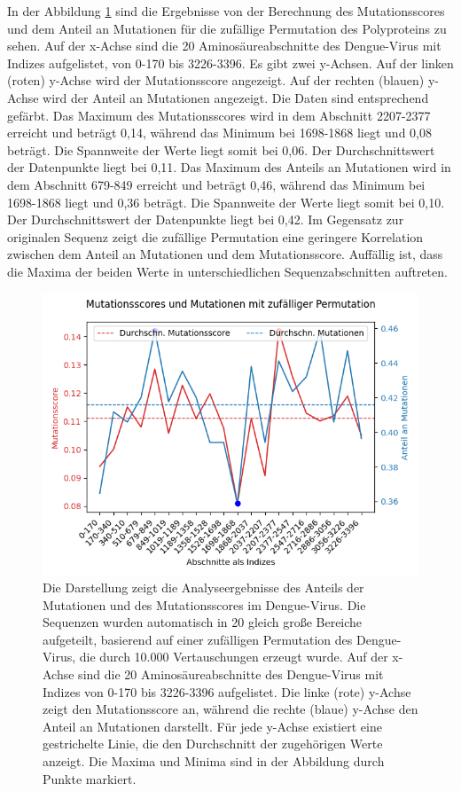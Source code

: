 \documentclass[german,version-2022-01]{uzl-thesis}
\begin{document}
In der Abbildung \ref{fig:Dengue_virus_scores_and_mutations_bereiche_random} sind die Ergebnisse von der Berechnung des Mutationsscores und dem Anteil an Mutationen f\"ur die zuf\"allige Permutation des Polyproteins zu sehen. Auf der x-Achse sind die 20 Aminos\"aureabschnitte des Dengue-Virus mit Indizes aufgelistet, von 0-170 bis 3226-3396. Es gibt zwei y-Achsen. Auf der linken (roten) y-Achse wird der Mutationsscore angezeigt. Auf der rechten (blauen) y-Achse wird der Anteil an Mutationen angezeigt. Die Daten sind entsprechend gef\"arbt. Das Maximum des Mutationsscores wird in dem Abschnitt 2207-2377 erreicht und betr\"agt 0,14, w\"ahrend das Minimum bei 1698-1868 liegt und 0,08 betr\"agt. Die Spannweite der Werte liegt somit bei 0,06. Der Durchschnittswert der Datenpunkte liegt bei 0,11. Das Maximum des Anteils an Mutationen wird in dem Abschnitt 679-849 erreicht und betr\"agt 0,46, w\"ahrend das Minimum bei 1698-1868 liegt und 0,36 betr\"agt. Die Spannweite der Werte liegt somit bei 0,10. Der Durchschnittswert der Datenpunkte liegt bei 0,42. Im Gegensatz zur originalen Sequenz zeigt die zuf\"allige Permutation eine geringere Korrelation zwischen dem Anteil an Mutationen und dem Mutationsscore. Auff\"allig ist, dass die Maxima der beiden Werte in unterschiedlichen Sequenzabschnitten auftreten.
\begin{figure}[tbp]
  \centering
  \includegraphics[scale=0.65]{Images/Diagramm_Scores_und_Mutationen_Dengue_viren_Bereiche_random.png}
  \caption{Die Darstellung zeigt die Analyseergebnisse des Anteils der Mutationen und des Mutationsscores im Dengue-Virus. Die Sequenzen wurden automatisch in 20 gleich gro\ss{}e Bereiche aufgeteilt, basierend auf einer zuf\"alligen Permutation des Dengue-Virus, die durch 10.000 Vertauschungen erzeugt wurde. Auf der x-Achse sind die 20 Aminos\"aureabschnitte des Dengue-Virus mit Indizes von 0-170 bis 3226-3396 aufgelistet. Die linke (rote) y-Achse zeigt den Mutationsscore an, w\"ahrend die rechte (blaue) y-Achse den Anteil an Mutationen darstellt. F\"ur jede y-Achse existiert eine gestrichelte Linie, die den Durchschnitt der zugeh\"origen Werte anzeigt. Die Maxima und Minima sind in der Abbildung durch Punkte markiert.}
  \label{fig:Dengue_virus_scores_and_mutations_bereiche_random}
\end{figure}
\end{document}
